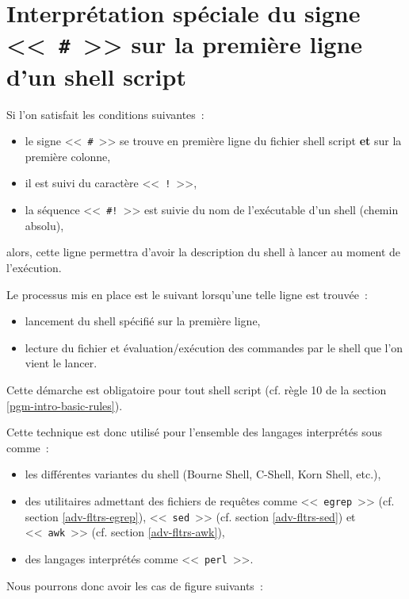 \section{Interpr{\'e}tation sp{\'e}ciale du signe <<~\texttt{\#}~>> sur la premi{\`e}re ligne d'un shell script}

Si l'on satisfait les conditions suivantes~:
\begin{itemize}
	\item	le signe <<~\verb=#=~>> se trouve en premi{\`e}re ligne du fichier shell script {\bf et}
			sur la premi{\`e}re colonne,
	\item	il est suivi du caract{\`e}re <<~\verb=!=~>>,
	\item	la s{\'e}quence <<~\verb=#!=~>> est suivie du nom de l'ex{\'e}cutable d'un shell (chemin absolu),
\end{itemize}

alors, cette ligne permettra d'avoir la description du shell {\`a} lancer au moment de l'ex{\'e}cution.

Le processus mis en place est le suivant lorsqu'une telle ligne est trouv{\'e}e~:
\begin{itemize}
	\item	lancement du shell sp{\'e}cifi{\'e} sur la premi{\`e}re ligne,
	\item	lecture du fichier et {\'e}valuation/ex{\'e}cution des commandes par le shell que l'on
			vient le lancer.
\end{itemize}

Cette d{\'e}marche est obligatoire pour tout shell script (cf. r{\`e}gle 10 de la section \ref{pgm-intro-basic-rules}).

Cette technique est donc utilis{\'e} pour l'ensemble des langages interpr{\'e}t{\'e}s sous {\Unix} comme~:
\begin{itemize}
	\item	les diff{\'e}rentes variantes du shell (Bourne Shell, C-Shell, Korn Shell, etc.),
	\item	des utilitaires admettant des fichiers de requ{\^e}tes comme <<~\texttt{egrep}~>> (cf. section \ref{adv-fltrs-egrep}),
			<<~\texttt{sed}~>> (cf. section \ref{adv-fltrs-sed}) et <<~\texttt{awk}~>> (cf. section \ref{adv-fltrs-awk}),
	\item	des langages interpr{\'e}t{\'e}s comme <<~\texttt{perl}~>>\cite{learning-perl,programming-perl,advpgm-perl}.
\end{itemize}

Nous pourrons donc avoir les cas de figure suivants~:


